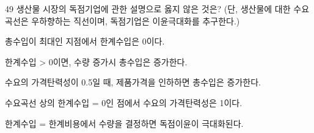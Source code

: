 \begin{question}{49}
생산물 시장의 독점기업에 관한 설명으로 옳지 않은 것은? (단, 생산물에 대한 수요곡선은 우하향하는 직선이며, 독점기업은 이윤극대화를 추구한다.)
\begin{choices}
  \item 총수입이 최대인 지점에서 한계수입은 0이다.
  \item 한계수입 > 0이면, 수량 증가시 총수입은 증가한다.
  \item 수요의 가격탄력성이 0.5일 때, 제품가격을 인하하면 총수입은 증가한다.
  \item 수요곡선 상의 한계수입 = 0인 점에서 수요의 가격탄력성은 1이다.
  \item 한계수입 = 한계비용에서 수량을 결정하면 독점이윤이 극대화된다.
\end{choices}
\end{question}
